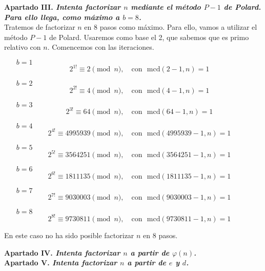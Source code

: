 \documentclass[fleqn]{article}
\begin{document}
    \newpage
    \textbf{Apartado III. \textit{Intenta factorizar $n$ mediante el método $P-1$ de Polard. Para ello llega, como máximo a $b=8$.}}\\
    Tratemos de factorizar $n$ en 8 pasos como máximo. Para ello, vamos a utilizar el método $P-1$ de Polard. Usaremos como base el 2, 
    que sabemos que es primo relativo con $n$. Comencemos con las iteraciones.
    \begin{enumerate}
        \item[$b=1$] $$2^{1!} \equiv 2 \pmod{n}, \quad \text{con }\text{ mcd}(2-1,n) = 1$$
        \item[$b=2$] $$2^{2!} \equiv 4 \pmod{n}, \quad \text{con }\text{ mcd}(4-1,n) = 1$$
        \item[$b=3$] $$2^{3!} \equiv 64 \pmod{n}, \quad \text{con }\text{ mcd}(64-1,n) = 1$$
        \item[$b=4$] $$2^{4!} \equiv 4995939 \pmod{n}, \quad \text{con }\text{ mcd}(4995939-1,n) = 1$$
        \item[$b=5$] $$2^{5!} \equiv 3564251 \pmod{n}, \quad \text{con }\text{ mcd}(3564251-1,n) = 1$$
        \item[$b=6$] $$2^{6!} \equiv 1811135 \pmod{n}, \quad \text{con }\text{ mcd}(1811135-1,n) = 1$$
        \item[$b=7$] $$2^{7!} \equiv 9030003 \pmod{n}, \quad \text{con }\text{ mcd}(9030003-1,n) = 1$$
        \item[$b=8$] $$2^{8!} \equiv 9730811 \pmod{n}, \quad \text{con }\text{ mcd}(9730811-1,n) = 1$$
    \end{enumerate}

    En este caso no ha sido posible factorizar $n$ en 8 pasos.

    
    \newpage
    \textbf{Apartado IV. \textit{Intenta factorizar $n$ a partir de $\varphi(n)$.}}\\

    \newpage
    \textbf{Apartado V. \textit{Intenta factorizar $n$ a partir de $e$ y $d$.}}\\ 
\end{document}
